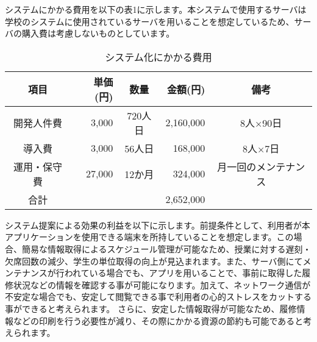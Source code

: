 システムにかかる費用を以下の表1に示します。本システムで使用するサーバは学校のシステムに使用されているサーバを用いることを想定しているため、サーバの購入費は考慮しないものとしています。

\begin{table}[htb]
  \begin{center}
    \caption{システム化にかかる費用}
    \begin{tabular}{|c|r|c|r|c|} \hline
      項目 & 単価(円) & 数量 & 金額(円)& 備考 \\ \hline \hline
      開発人件費 & 3,000 & 720人日 & 2,160,000 & 8人×90日 \\ \hline
      導入費 & 3,000 & 56人日 & 168,000 & 8人×7日 \\ \hline
      運用・保守費 & 27,000 & 12か月 & 324,000 & 月一回のメンテナンス \\ \hline
      合計 & & & 2,652,000 & \\\hline
    \end{tabular}
  \end{center}
\end{table}


システム提案による効果の利益を以下に示します。前提条件として、利用者が本アプリケーションを使用できる端末を所持していることを想定します。この場合、簡易な情報取得によるスケジュール管理が可能なため、授業に対する遅刻・欠席回数の減少、学生の単位取得の向上が見込まれます。また、サーバ側にてメンテナンスが行われている場合でも、アプリを用いることで、事前に取得した履修状況などの情報を確認する事が可能になります。加えて、ネットワーク通信が不安定な場合でも、安定して閲覧できる事で利用者の心的ストレスをカットする事ができると考えられます。
さらに、安定した情報取得が可能なため、履修情報などの印刷を行う必要性が減り、その際にかかる資源の節約も可能であると考えられます。
